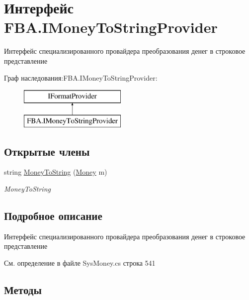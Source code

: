 \hypertarget{interface_f_b_a_1_1_i_money_to_string_provider}{}\section{Интерфейс F\+B\+A.\+I\+Money\+To\+String\+Provider}
\label{interface_f_b_a_1_1_i_money_to_string_provider}


Интерфейс специализированного провайдера преобразования денег в строковое представление  


Граф наследования\+:F\+B\+A.\+I\+Money\+To\+String\+Provider\+:\begin{figure}[H]
\begin{center}
\leavevmode
\includegraphics[height=2.000000cm]{interface_f_b_a_1_1_i_money_to_string_provider}
\end{center}
\end{figure}
\subsection*{Открытые члены}
\begin{DoxyCompactItemize}
\item 
string \mbox{\hyperlink{interface_f_b_a_1_1_i_money_to_string_provider_a3eebf3898729bb36e2841bd2477f47e9}{Money\+To\+String}} (\mbox{\hyperlink{struct_f_b_a_1_1_money}{Money}} m)
\begin{DoxyCompactList}\small\item\em Money\+To\+String \end{DoxyCompactList}\end{DoxyCompactItemize}


\subsection{Подробное описание}
Интерфейс специализированного провайдера преобразования денег в строковое представление 



См. определение в файле Sys\+Money.\+cs строка 541



\subsection{Методы}
\mbox{\label{interface_f_b_a_1_1_i_money_to_string_provider_a3eebf3898729bb36e2841bd2477f47e9}} 
